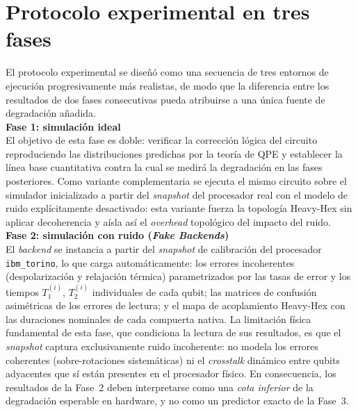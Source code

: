 \documentclass[12pt, spanish]{book}
\begin{document}
\section{Protocolo experimental en tres fases}
\label{sec:protocolo_fases}

El protocolo experimental se diseñó como una secuencia de tres entornos de ejecución progresivamente más realistas, de modo que la diferencia entre los resultados de dos fases consecutivas pueda atribuirse a una única fuente de degradación añadida.\\

\textbf{Fase 1: simulación ideal}\\

El objetivo de esta fase es doble: verificar la corrección lógica del circuito reproduciendo las distribuciones predichas por la teoría de QPE y establecer la línea base cuantitativa contra la cual se medirá la degradación en las fases posteriores. Como variante complementaria se ejecuta el mismo circuito sobre el simulador inicializado a partir del \textit{snapshot} del procesador real con el modelo de ruido explícitamente desactivado: esta variante fuerza la topología Heavy-Hex sin aplicar decoherencia y aísla así el \textit{overhead} topológico del impacto del ruido.\\

\textbf{Fase 2: simulación con ruido (\textit{Fake Backends})}\\

El \textit{backend} se instancia a partir del \textit{snapshot} de calibración del procesador \texttt{ibm\_torino}, lo que carga automáticamente: los errores incoherentes (despolarización y relajación térmica) parametrizados por las tasas de error y los tiempos $T_1^{(i)}$, $T_2^{(i)}$ individuales de cada qubit; las matrices de confusión asimétricas de los errores de lectura; y el mapa de acoplamiento Heavy-Hex con las duraciones nominales de cada compuerta nativa. La limitación física fundamental de esta fase, que condiciona la lectura de sus resultados, es que el \textit{snapshot} captura exclusivamente ruido incoherente: no modela los errores coherentes (sobre-rotaciones sistemáticas) ni el \textit{crosstalk} dinámico entre qubits adyacentes que sí están presentes en el procesador físico. En consecuencia, los resultados de la Fase~2 deben interpretarse como una \textit{cota inferior} de la degradación esperable en hardware, y no como un predictor exacto de la Fase~3.\\
\end{document}
